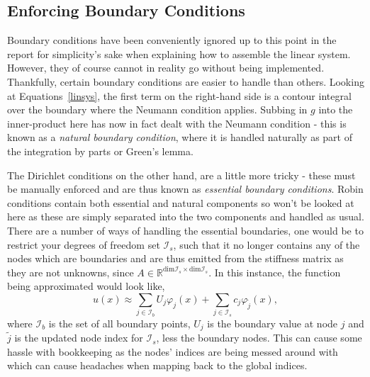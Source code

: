 \subsection{Enforcing Boundary Conditions}

Boundary conditions have been conveniently ignored up to this point in the report for simplicity's sake when explaining how to assemble the linear system. However, they of course cannot in reality go without being implemented. Thankfully, certain boundary conditions are easier to handle than others. Looking at Equations~\eqref{linsys}, the first term on the right-hand side is a contour integral over the boundary where the Neumann condition applies. Subbing in $g$ into the inner-product here has now in fact dealt with the Neumann condition - this is known as a \textit{natural boundary condition}, where it is handled naturally as part of the integration by parts or Green's lemma.

The Dirichlet conditions on the other hand, are a little more tricky - these must be manually enforced and are thus known as \textit{essential boundary conditions}. Robin conditions contain both essential and natural components so won't be looked at here as these are simply separated into the two components and handled as usual. There are a number of ways of handling the essential boundaries, one would be to restrict your degrees of freedom set $\mathcal{I}_s$, such that it no longer contains any of the nodes which are boundaries and are thus emitted from the stiffness matrix as they are not unknowns, since $A \in \mathbb{R}^{\text{dim} \mathcal{I}_s \times \text{dim}\mathcal{I}_s}$. In this instance, the function being approximated would look like,
\begin{equation}
	u(x) \approx \sum_{j\in\mathcal{I}_b}U_j\varphi_j(x) + \sum_{j\in\mathcal{I}_s}c_j \varphi_{\widetilde j}(x),
\end{equation}
where $\mathcal{I}_b$ is the set of all boundary points, $U_j$ is the boundary value at node $j$ and $\widetilde{j}$ is the updated node index for $\mathcal{I}_s$, less the boundary nodes. This can cause some hassle with bookkeeping as the nodes' indices are being messed around with which can cause headaches when mapping back to the global indices.

